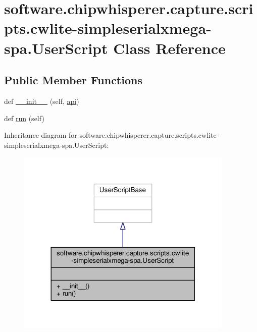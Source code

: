 \hypertarget{classsoftware_1_1chipwhisperer_1_1capture_1_1scripts_1_1cwlite-simpleserialxmega-spa_1_1UserScript}{}\section{software.\+chipwhisperer.\+capture.\+scripts.\+cwlite-\/simpleserialxmega-\/spa.User\+Script Class Reference}
\label{classsoftware_1_1chipwhisperer_1_1capture_1_1scripts_1_1cwlite-simpleserialxmega-spa_1_1UserScript}
\subsection*{Public Member Functions}
\begin{DoxyCompactItemize}
\item 
def \hyperlink{classsoftware_1_1chipwhisperer_1_1capture_1_1scripts_1_1cwlite-simpleserialxmega-spa_1_1UserScript_a5e177d465150c5fce4726427dd688fce}{\+\_\+\+\_\+init\+\_\+\+\_\+} (self, \hyperlink{namespacesoftware_1_1chipwhisperer_1_1capture_1_1scripts_1_1cwlite-simpleserialxmega-spa_a516520bd4dcd77d2e1fd5ffbdb0b8d90}{api})
\item 
def \hyperlink{classsoftware_1_1chipwhisperer_1_1capture_1_1scripts_1_1cwlite-simpleserialxmega-spa_1_1UserScript_adde3063375b3a810694dfd274ad52d4f}{run} (self)
\end{DoxyCompactItemize}


Inheritance diagram for software.\+chipwhisperer.\+capture.\+scripts.\+cwlite-\/simpleserialxmega-\/spa.User\+Script\+:\nopagebreak
\begin{figure}[H]
\begin{center}
\leavevmode
\includegraphics[width=293pt]{d7/d70/classsoftware_1_1chipwhisperer_1_1capture_1_1scripts_1_1cwlite-simpleserialxmega-spa_1_1UserScript__inherit__graph}
\end{center}
\end{figure}



